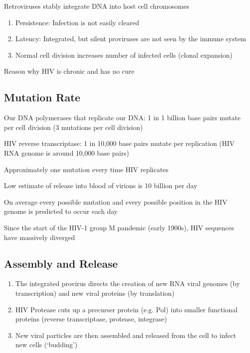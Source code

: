 \documentclass{notes}
\begin{document}
Retroviruses stably integrate DNA into host cell chromosomes

\begin{enumerate}
    \item Persistence: Infection is not easily cleared
    \item Latency: Integrated, but silent proviruses are not seen by the immune system
    \item Normal cell division increases number of infected cells (clonal expansion)
\end{enumerate}

\tab \indicates Reason why HIV is chronic and has no cure

\subsection{Mutation Rate}

Our DNA polymerases that replicate our DNA: 1 in 1 billion base pairs mutate per cell division (3 mutations per cell division)

HIV reverse transcriptase: 1 in 10,000 base pairs mutate per replication (HIV RNA genome is around 10,000 base pairs)

\tab Approximately one mutation every time HIV replicates

\tab Low estimate of release into blood of virions is 10 billion per day

\tab On average every possible mutation and every possible position in the HIV genome is predicted to occur each day

\tab Since the start of the HIV-1 group M pandemic (early 1900s), HIV sequences have massively diverged


\subsection{Assembly and Release}

\begin{enumerate}
    \item The integrated provirus directs the creation of new RNA viral genomes (by transcription) and new viral proteins (by translation)
    \item HIV Protease cuts up a precurser protein (e.g. Pol) into smaller functional proteins (reverse transcriptase, protease, integrase)
    \item New viral particles are then assembled and released from the cell to infect new cells (`budding')
\end{enumerate}
\end{document}

